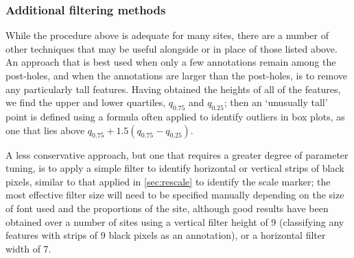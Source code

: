 \documentclass[../../ArchStats.tex]{subfiles}
\begin{document}





\subsubsection{Additional filtering methods}
\label{sec:alternative-techniques}

While the procedure above is adequate for many sites, there are a number of other techniques that may be useful alongside or in place of those listed above. An approach that is best used when only a few annotations remain among the post-holes, and when the annotations are larger than the post-holes, is to remove any particularly tall features. Having obtained the heights of all of the features, we find the upper and lower quartiles, $q_{0.75}$ and $q_{0.25}$; then an `unusually tall' point is defined using a formula often applied to identify outliers in box plots, as one that lies above $q_{0.75} + 1.5(q_{0.75} - q_{0.25})$.

A less conservative approach, but one that requires a greater degree of parameter tuning, is to apply a simple filter to identify horizontal or vertical strips of black pixels, similar to that applied in \ref{sec:rescale} to identify the scale marker; the most effective filter size will need to be specified manually depending on the size of font used and the proportions of the site, although good results have been obtained over a number of sites using a vertical filter height of 9 (classifying any features with strips of 9 black pixels as an annotation), or a horizontal filter width of 7.
\end{document}
